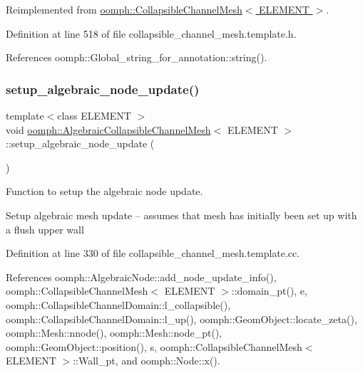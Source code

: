Reimplemented from \hyperlink{classoomph_1_1CollapsibleChannelMesh_aac6057b4e572cb47923570b5e9c781c4}{oomph\+::\+Collapsible\+Channel\+Mesh$<$ E\+L\+E\+M\+E\+N\+T $>$}.



Definition at line 518 of file collapsible\+\_\+channel\+\_\+mesh.\+template.\+h.



References oomph\+::\+Global\+\_\+string\+\_\+for\+\_\+annotation\+::string().

\mbox{\label{classoomph_1_1AlgebraicCollapsibleChannelMesh_a54e93316a561cd77a68c0774d2772030}} 
\subsubsection{\texorpdfstring{setup\+\_\+algebraic\+\_\+node\+\_\+update()}{setup\_algebraic\_node\_update()}}
{\footnotesize\ttfamily template$<$class E\+L\+E\+M\+E\+NT $>$ \\
void \hyperlink{classoomph_1_1AlgebraicCollapsibleChannelMesh}{oomph\+::\+Algebraic\+Collapsible\+Channel\+Mesh}$<$ E\+L\+E\+M\+E\+NT $>$\+::setup\+\_\+algebraic\+\_\+node\+\_\+update (\begin{DoxyParamCaption}{ }\end{DoxyParamCaption})\hspace{0.3cm}{\ttfamily [protected]}}



Function to setup the algebraic node update. 

Setup algebraic mesh update -- assumes that mesh has initially been set up with a flush upper wall 

Definition at line 330 of file collapsible\+\_\+channel\+\_\+mesh.\+template.\+cc.



References oomph\+::\+Algebraic\+Node\+::add\+\_\+node\+\_\+update\+\_\+info(), oomph\+::\+Collapsible\+Channel\+Mesh$<$ E\+L\+E\+M\+E\+N\+T $>$\+::domain\+\_\+pt(), e, oomph\+::\+Collapsible\+Channel\+Domain\+::l\+\_\+collapsible(), oomph\+::\+Collapsible\+Channel\+Domain\+::l\+\_\+up(), oomph\+::\+Geom\+Object\+::locate\+\_\+zeta(), oomph\+::\+Mesh\+::nnode(), oomph\+::\+Mesh\+::node\+\_\+pt(), oomph\+::\+Geom\+Object\+::position(), s, oomph\+::\+Collapsible\+Channel\+Mesh$<$ E\+L\+E\+M\+E\+N\+T $>$\+::\+Wall\+\_\+pt, and oomph\+::\+Node\+::x().

